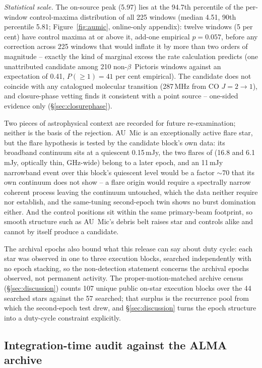 \documentclass{openjournal}
\begin{document}
\emph{Statistical scale.} The on-source peak (5.97) lies at the
94.7th percentile of the per-window control-maxima distribution of
all 225 windows (median 4.51, 90th percentile 5.81;
Figure~\ref{fig:aumic}, online-only appendix): twelve windows (5 per
cent) have control maxima at or above it, add-one empirical
$p=0.057$, before any correction across 225 windows that would
inflate it by more than two orders of magnitude -- exactly the kind
of marginal excess the rate calculation predicts (one unattributed
candidate among 210 non-$\beta$~Pictoris windows against an
expectation of 0.41, $P(\geq1)=41$ per cent empirical). The candidate
does not coincide with any catalogued molecular transition
(287\,MHz from CO $J{=}2{\to}1$), and closure-phase vetting finds it
consistent with a point source -- one-sided evidence only
(\S\ref{sec:closurephase}).

Two pieces of astrophysical context are recorded for future
re-examination; neither is the basis of the rejection. AU~Mic is an
exceptionally active flare star, but the flare hypothesis is tested
by the candidate block's own data: its broadband continuum sits at a
quiescent 0.15\,mJy, the two flares of \citet{MacGregor2020} (16.8
and 6.1\,mJy, optically thin, GHz-wide) belong to a later epoch, and
an 11\,mJy narrowband event over this block's quiescent level would
be a factor ${\sim}70$ that its own continuum does not show -- a flare
origin would require a spectrally narrow coherent process leaving the
continuum untouched, which the data neither require nor establish,
and the same-tuning second-epoch twin shows no burst domination
either. And the control positions sit within the same primary-beam
footprint, so smooth structure such as AU~Mic's debris belt raises
star and controls alike and cannot by itself produce a candidate.

The archival epochs also bound what this release can say about duty
cycle: each star was observed in one to three execution blocks,
searched independently with no epoch stacking, so the non-detection
statement concerns the archival epochs observed, not permanent
activity. The proper-motion-matched archive census
(\S\ref{sec:discussion}) counts 107 unique public on-star execution
blocks over the 44 searched stars against the 57 searched; that
surplus is the recurrence pool from which the second-epoch test drew,
and \S\ref{sec:discussion} turns the epoch structure into a
duty-cycle constraint explicitly.
\subsection{Integration-time audit against the ALMA archive}
\label{sec:timeaudit}
\end{document}
